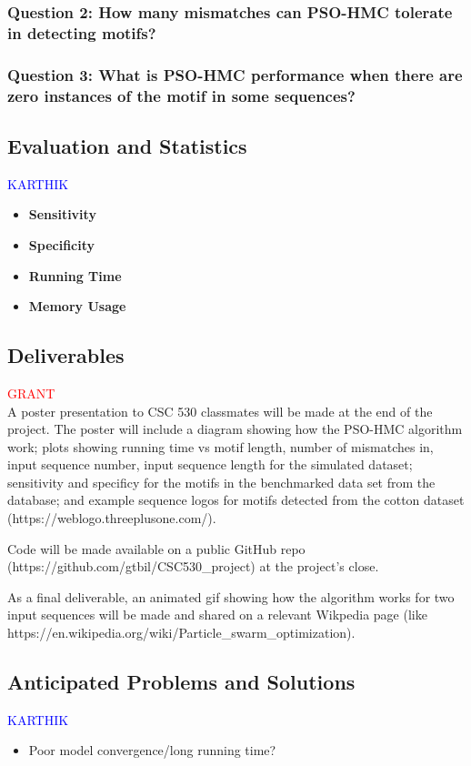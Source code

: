 \documentclass{article}
\begin{document}
\subsubsection{Question 2: How many mismatches can PSO-HMC tolerate in detecting motifs?}
\subsubsection{Question 3: What is PSO-HMC performance when there are zero instances of the motif in some sequences?}
\subsection{Evaluation and Statistics}
\textcolor{blue}{KARTHIK} \\
\begin{itemize}
	\item \textbf{Sensitivity}
	\item \textbf{Specificity}
	\item \textbf{Running Time}
	\item \textbf{Memory Usage}
\end{itemize}
\subsection{Deliverables}
\textcolor{red}{GRANT} \\
A poster presentation to CSC 530 classmates will be made at the end of the project. The poster will include a diagram showing how the PSO-HMC algorithm work; plots showing running time vs motif length, number of mismatches in, input sequence number, input sequence length for the simulated dataset; sensitivity and specificy for the motifs in the benchmarked data set from the database; and example sequence logos for motifs detected from the cotton dataset (https://weblogo.threeplusone.com/).  
  
  Code will be made available on a public GitHub repo (https://github.com/gtbil/CSC530\_project) at the project's close.  
  
  As a final deliverable, an animated gif showing how the algorithm works for two input sequences will be made and shared on a relevant Wikpedia page (like https://en.wikipedia.org/wiki/Particle\_swarm\_optimization).
\subsection{Anticipated Problems and Solutions}
\textcolor{blue}{KARTHIK} \\
\begin{itemize}
	\item Poor model convergence/long running time?
\end{itemize}
\pagebreak
\end{document}
